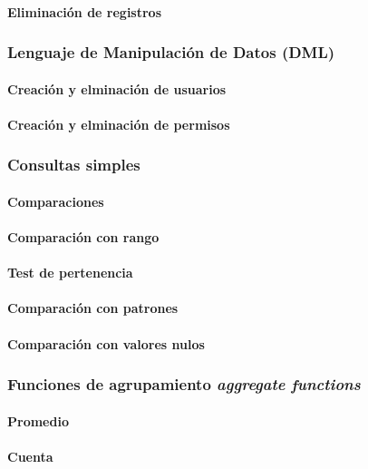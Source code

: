 \documentclass[12pt]{report}
\begin{document}
				\paragraph{Eliminación de registros}
			\subsubsection{Lenguaje de Manipulación de Datos (DML)}
				\paragraph{Creación y elminación de usuarios}
				\paragraph{Creación y elminación de permisos}
			\subsubsection{Consultas simples}
				\paragraph{Comparaciones}
				\paragraph{Comparación con rango}
				\paragraph{Test de pertenencia}
				\paragraph{Comparación con patrones}
				\paragraph{Comparación con valores nulos}
			\subsubsection{Funciones de agrupamiento \textit{aggregate functions}}
				\paragraph{Promedio}
				\paragraph{Cuenta}
\end{document}
